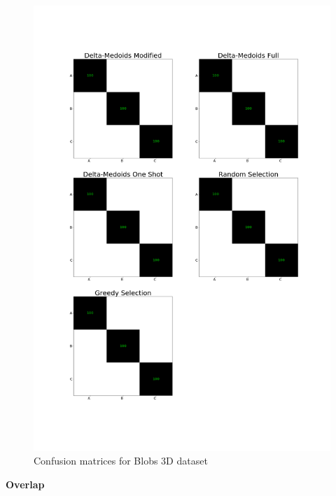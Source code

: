 \documentclass[thesis=B,english]{FITthesis}[2012/10/20]
\begin{document}
\begin{figure}[t]
   \includegraphics[width=\linewidth]{img/exp1_blobs.png}
  \caption{Confusion matrices for Blobs 3D dataset}
  \label{img:exp1_blobs}
\end{figure}

\textbf{Overlap}
\end{document}
